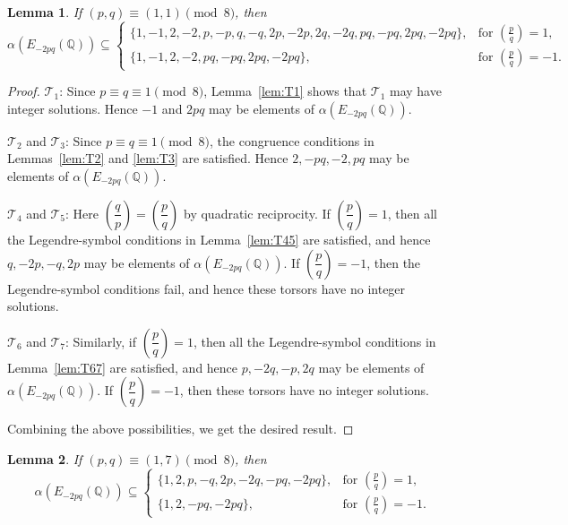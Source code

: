 \documentclass[12pt]{amsart}
\newcommand{\bbQ}{\mathbb{Q}}
\newcommand{\cT}{\mathcal{T}}
\newcommand{\legendre}[2]{\genfrac{(}{)}{}{}{#1}{#2}}
\numberwithin{equation}{section}
\newtheorem{lem}{Lemma}[section]
\theoremstyle{definition}
\begin{document}
\begin{lem}
\label{lem:alpha_case_1.1}
If $(p,q)\equiv (1,1)\pmod 8$, then
\[
\alpha\left(E_{-2pq}(\bbQ)\right)\subseteq
\begin{cases}
\{1,-1,2,-2,p,-p,q,-q,2p,-2p,2q,-2q,pq,-pq,2pq,-2pq\},
& \text{for } \legendre{p}{q}=1,\\
\{1,-1,2,-2,pq,-pq,2pq,-2pq\},
& \text{for } \legendre{p}{q}=-1.
\end{cases}
\]
\end{lem}
\begin{proof}
$\cT_{1}$: Since $p\equiv q\equiv 1\pmod 8$, Lemma~\ref{lem:T1} shows that $\cT_{1}$ may have integer solutions. Hence $-1$ and $2pq$ may be elements of $\alpha\left(E_{-2pq}(\bbQ)\right)$.

$\cT_{2}$ and $\cT_{3}$: Since $p\equiv q\equiv 1\pmod 8$, the congruence conditions in Lemmas~\ref{lem:T2} and \ref{lem:T3} are satisfied. Hence $2,-pq,-2,pq$ may be elements of $\alpha\left(E_{-2pq}(\bbQ)\right)$.

$\cT_{4}$ and $\cT_{5}$: Here $\left(\dfrac{q}{p}\right)=\left(\dfrac{p}{q}\right)$ by quadratic reciprocity. If $\left(\dfrac{p}{q}\right)=1$, then all the Legendre-symbol conditions in Lemma~\ref{lem:T45} are satisfied, and hence $q,-2p,-q,2p$ may be elements of $\alpha\left(E_{-2pq}(\bbQ)\right)$. If $\left(\dfrac{p}{q}\right)=-1$, then the Legendre-symbol conditions fail, and hence these torsors have no integer solutions.

$\cT_{6}$ and $\cT_{7}$: Similarly, if $\left(\dfrac{p}{q}\right)=1$, then all the Legendre-symbol conditions in Lemma~\ref{lem:T67} are satisfied, and hence $p,-2q,-p,2q$ may be elements of $\alpha\left(E_{-2pq}(\bbQ)\right)$. If $\left(\dfrac{p}{q}\right)=-1$, then these torsors have no integer solutions.

Combining the above possibilities, we get the desired result.
\end{proof}


\begin{lem}
\label{lem:alpha_case_1.2}
If $(p,q)\equiv (1,7)\pmod 8$, then
\[
\alpha\left(E_{-2pq}(\bbQ)\right)\subseteq
\begin{cases}
\{1,2,p,-q,2p,-2q,-pq,-2pq\},
& \text{for } \legendre{p}{q}=1,\\
\{1,2,-pq,-2pq\},
& \text{for } \legendre{p}{q}=-1.
\end{cases}
\]
\end{lem}

\end{document}
